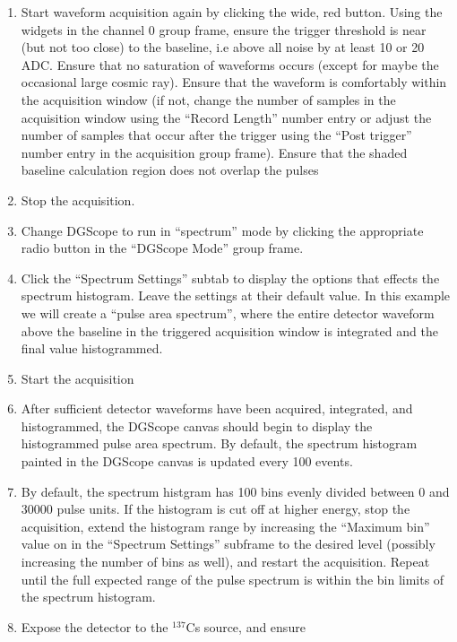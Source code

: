 \begin{enumerate}
  \item{Start waveform acquisition again by clicking the wide, red
    button. Using the widgets in the channel 0 group frame, ensure the
    trigger threshold is near (but not too close) to the baseline, i.e
    above all noise by at least 10 or 20 ADC. Ensure that no
    saturation of waveforms occurs (except for maybe the occasional
    large cosmic ray). Ensure that the waveform is comfortably within
    the acquisition window (if not, change the number of samples in
    the acquisition window using the ``Record Length'' number entry or
    adjust the number of samples that occur after the trigger using
    the ``Post trigger'' number entry in the acquisition group
    frame). Ensure that the shaded baseline calculation region does
    not overlap the pulses}
  \item{Stop the acquisition.}
  \item{Change DGScope to run in ``spectrum'' mode by clicking the
    appropriate radio button in the ``DGScope Mode'' group frame.}
  \item{Click the ``Spectrum Settings'' subtab to display the options
    that effects the spectrum histogram. Leave the settings at their
    default value. In this example we will create a ``pulse area
    spectrum'', where the entire detector waveform above the baseline
    in the triggered acquisition window is integrated and the
    final value histogrammed.}
    \item{Start the acquisition}
    \item{After sufficient detector waveforms have been acquired,
      integrated, and histogrammed, the DGScope canvas should begin to
      display the histogrammed pulse area spectrum. By default, the
      spectrum histogram painted in the DGScope canvas is updated
      every 100 events.}
    \item{By default, the spectrum histgram has 100 bins evenly
      divided between 0 and 30000 pulse units. If the histogram is cut
      off at higher energy, stop the acquisition, extend the histogram
      range by increasing the ``Maximum bin'' value on in the
      ``Spectrum Settings'' subframe to the desired level (possibly
      increasing the number of bins as well), and restart the
      acquisition. Repeat until the full expected range of the pulse
      spectrum is within the bin limits of the spectrum histogram.}
    \item{Expose the detector to the $^{137}$Cs source, and ensure
}
\end{enumerate}
